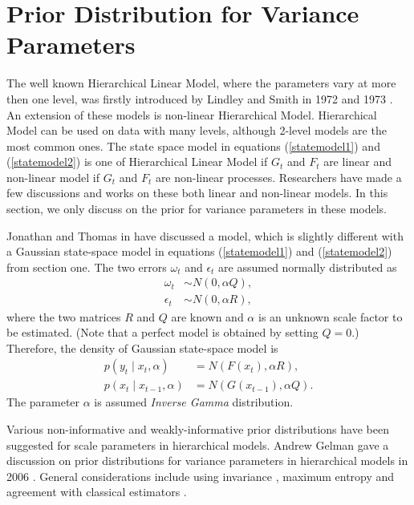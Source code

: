 \section{Prior Distribution for Variance Parameters}

The well known Hierarchical Linear Model, where the parameters vary at more then one level, was firstly introduced by Lindley and Smith in 1972 and 1973 \cite{lindley1972bayes} \cite{smith1973general}. An extension of these models is   non-linear Hierarchical Model. Hierarchical Model can be used on data with many levels, although 2-level models are the most common ones. The state space model in equations (\ref{statemodel1}) and (\ref{statemodel2}) is one of Hierarchical Linear Model if $G_t$ and $F_t$ are linear and non-linear model if $G_t$ and $F_t$ are non-linear processes. Researchers have made a few discussions and works on these both linear and non-linear models. In this section, we only discuss on the prior for variance parameters in these models. 

Jonathan and Thomas in \cite{stroud2007sequential} have discussed a model, which is slightly different with a Gaussian state-space model in equations (\ref{statemodel1}) and (\ref{statemodel2}) from section one. The two errors $\omega_t$ and $\epsilon_t$ are assumed normally distributed as
\begin{align*}
\omega_t &\sim N(0,\alpha Q),\\
\epsilon_t &\sim N(0,\alpha R),
\end{align*}
where the two matrices $R$ and $Q$ are known and $\alpha$ is an unknown scale factor to be estimated. (Note that a perfect model is obtained by setting $Q= 0$.) Therefore, the density of Gaussian state-space model is
\begin{align*}
p(y_t\mid x_t,\alpha) &= N(F(x_t),\alpha R),\\
p(x_t\mid x_{t-1},\alpha) &= N(G(x_{t-1}),\alpha Q).
\end{align*}
The parameter $\alpha$ is assumed \textit{Inverse Gamma} distribution. 

Various non-informative and weakly-informative prior distributions have been suggested for
scale parameters in hierarchical models. Andrew Gelman gave a discussion on prior distributions for variance parameters in hierarchical models in 2006 \cite{gelman2006prior}. General considerations include using invariance \cite{jeffries1961theory}, maximum entropy \cite{jaynes1983papers} and agreement with classical estimators \cite{box2011bayesian}. 


